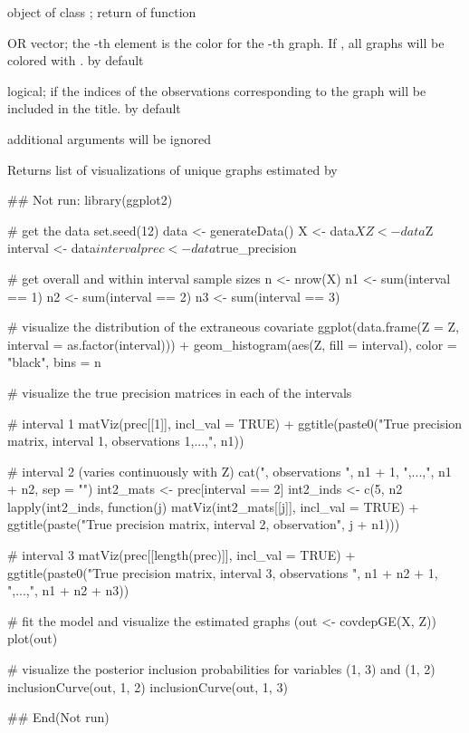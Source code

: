 \documentclass[a4paper]{book}
\begin{document}
%
\begin{Arguments}
\begin{ldescription}
\item[\code{x}] object of class ; return of  function

\item[\code{graph\_colors}]  OR vector; the -th element is the color for
the -th graph. If , all graphs will be colored with .
 by default

\item[\code{title\_sum}] logical; if  the indices of the observations
corresponding to the graph will be included in the title.  by default

\item[\code{...}] additional arguments will be ignored
\end{ldescription}
\end{Arguments}
%
\begin{Value}
Returns list of  visualizations of unique graphs estimated
by 
\end{Value}
%
\begin{Examples}
\begin{ExampleCode}
## Not run: 
library(ggplot2)

# get the data
set.seed(12)
data <- generateData()
X <- data$X
Z <- data$Z
interval <- data$interval
prec <- data$true_precision

# get overall and within interval sample sizes
n <- nrow(X)
n1 <- sum(interval == 1)
n2 <- sum(interval == 2)
n3 <- sum(interval == 3)

# visualize the distribution of the extraneous covariate
ggplot(data.frame(Z = Z, interval = as.factor(interval))) +
  geom_histogram(aes(Z, fill = interval), color = "black", bins = n %

# visualize the true precision matrices in each of the intervals

# interval 1
matViz(prec[[1]], incl_val = TRUE) +
  ggtitle(paste0("True precision matrix, interval 1, observations 1,...,", n1))

# interval 2 (varies continuously with Z)
cat(", observations ", n1 + 1, ",...,", n1 + n2, sep = "")
int2_mats <- prec[interval == 2]
int2_inds <- c(5, n2 %
lapply(int2_inds, function(j) matViz(int2_mats[[j]], incl_val = TRUE) +
         ggtitle(paste("True precision matrix, interval 2, observation", j + n1)))

# interval 3
matViz(prec[[length(prec)]], incl_val = TRUE) +
  ggtitle(paste0("True precision matrix, interval 3, observations ",
                 n1 + n2 + 1, ",...,", n1 + n2 + n3))

# fit the model and visualize the estimated graphs
(out <- covdepGE(X, Z))
plot(out)

# visualize the posterior inclusion probabilities for variables (1, 3) and (1, 2)
inclusionCurve(out, 1, 2)
inclusionCurve(out, 1, 3)

## End(Not run)
\end{ExampleCode}
\end{Examples}
\printindex{}
\end{document}
